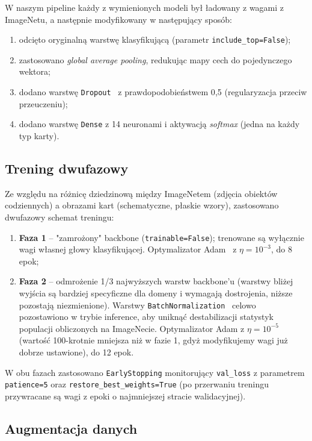 \documentclass[12pt]{article}
\begin{document}
W naszym pipeline każdy z wymienionych modeli był ładowany z wagami z ImageNetu, a następnie modyfikowany w następujący sposób:
\begin{enumerate}
  \item odcięto oryginalną warstwę klasyfikującą (parametr \texttt{include\_top=False});
  \item zastosowano \textit{global average pooling}, redukując mapy cech do pojedynczego wektora;
  \item dodano warstwę \texttt{Dropout}~\cite{dropout} z prawdopodobieństwem 0{,}5 (regularyzacja przeciw przeuczeniu);
  \item dodano warstwę \texttt{Dense} z 14 neuronami i aktywacją \textit{softmax} (jedna na każdy typ karty).
\end{enumerate}

\subsection{Trening dwufazowy}

Ze względu na różnicę dziedzinową między ImageNetem (zdjęcia obiektów codziennych) a obrazami kart (schematyczne, płaskie wzory), zastosowano dwufazowy schemat treningu:

\begin{enumerate}
  \item {\bf Faza 1} -- "zamrożony" backbone (\texttt{trainable=False}); trenowane są wyłącznie wagi własnej głowy klasyfikującej. Optymalizator Adam~\cite{adam} z $\eta = 10^{-3}$, do 8 epok;
  \item {\bf Faza 2} -- odmrożenie 1/3 najwyższych warstw backbone'u (warstwy bliżej wyjścia są bardziej specyficzne dla domeny i wymagają dostrojenia, niższe pozostają niezmienione). Warstwy \texttt{BatchNormalization}~\cite{batchnorm} celowo pozostawiono w trybie inference, aby uniknąć destabilizacji statystyk populacji obliczonych na ImageNecie. Optymalizator Adam z $\eta = 10^{-5}$ (wartość 100-krotnie mniejsza niż w fazie 1, gdyż modyfikujemy wagi już dobrze ustawione), do 12 epok.
\end{enumerate}

W obu fazach zastosowano \texttt{EarlyStopping} monitorujący \texttt{val\_loss} z parametrem \texttt{patience=5} oraz \texttt{restore\_best\_weights=True} (po przerwaniu treningu przywracane są wagi z epoki o najmniejszej stracie walidacyjnej).

\subsection{Augmentacja danych}
\end{document}
